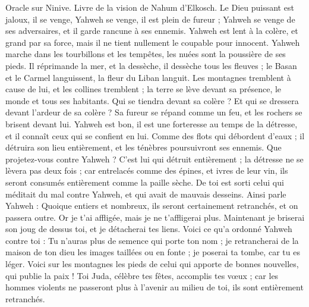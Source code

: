 \BFont
\begin{multicols}{2}
\VerseOne{}Oracle sur Ninive. Livre de la vision de Nahum d’Elkosch.
Le Dieu puissant est jaloux, il se venge, Yahweh se venge, il est plein de fureur ; Yahweh se venge de ses adversaires, et il garde rancune à ses ennemis.
Yahweh est lent à la colère, et grand par sa force, mais il ne tient nullement le coupable pour innocent. Yahweh marche dans les tourbillons et les tempêtes, les nuées sont la poussière de ses pieds.
Il réprimande la mer, et la dessèche, il dessèche tous les fleuves ; le Basan et le Carmel languissent, la fleur du Liban languit.
Les montagnes tremblent à cause de lui, et les collines tremblent ; la terre se lève devant sa présence, le monde et tous ses habitants.
Qui se tiendra devant sa colère ? Et qui se dressera devant l'ardeur de sa colère ? Sa fureur se répand comme un feu, et les rochers se brisent devant lui.
Yahweh est bon, il est une forteresse au temps de la détresse, et il connaît ceux qui se confient en lui.
Comme des flots qui débordent d'eaux ; il détruira son lieu entièrement, et les ténèbres poursuivront ses ennemis.
Que projetez-vous contre Yahweh ? C'est lui qui détruit entièrement ; la détresse ne se lèvera pas deux fois ;
car entrelacés comme des épines, et ivres de leur vin, ils seront consumés entièrement comme la paille sèche.
De toi est sorti celui qui méditait du mal contre Yahweh, et qui avait de mauvais desseins.
Ainsi parle Yahweh : Quoique entiers et nombreux, ils seront certainement retranchés, et on passera outre. Or je t'ai affligée, mais je ne t'affligerai plus.
Maintenant je briserai son joug de dessus toi, et je détacherai tes liens.
Voici ce qu’a ordonné Yahweh contre toi : Tu n’auras plus de semence qui porte ton nom ; je retrancherai de la maison de ton dieu les images taillées ou en fonte ; je poserai ta tombe, car tu es léger.
\VerseOne{}Voici sur les montagnes les pieds de celui qui apporte de bonnes nouvelles, qui publie la paix ! Toi Juda, célèbre tes fêtes, accomplis tes vœux ; car les hommes violents ne passeront plus à l'avenir au milieu de toi, ils sont entièrement retranchés.

\end{multicols}
